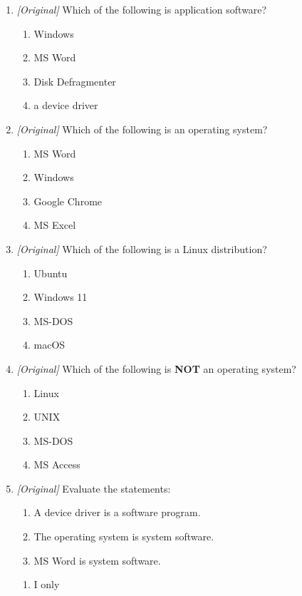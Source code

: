 \begin{enumerate}[label=\textbf{Q\arabic*.}, leftmargin=*]
\begin{enumerate}[label=\Alph*.]
  \end{enumerate}
\item \textit{[Original]} Which of the following is application software?
  \begin{enumerate}[label=\Alph*.]
    \item Windows
    \item MS Word
    \item Disk Defragmenter
    \item a device driver
  \end{enumerate}
\item \textit{[Original]} Which of the following is an operating system?
  \begin{enumerate}[label=\Alph*.]
    \item MS Word
    \item Windows
    \item Google Chrome
    \item MS Excel
  \end{enumerate}
\item \textit{[Original]} Which of the following is a Linux distribution?
  \begin{enumerate}[label=\Alph*.]
    \item Ubuntu
    \item Windows 11
    \item MS-DOS
    \item macOS
  \end{enumerate}
\item \textit{[Original]} Which of the following is \textbf{NOT} an operating
  system?
  \begin{enumerate}[label=\Alph*.]
    \item Linux
    \item UNIX
    \item MS-DOS
    \item MS Access
  \end{enumerate}
\item \textit{[Original]} Evaluate the statements:
  \begin{enumerate}[label=\Roman*.]
    \item A device driver is a software program.
    \item The operating system is system software.
    \item MS Word is system software.
  \end{enumerate}
  \begin{enumerate}[label=\Alph*.]
    \item I only

\end{enumerate}
\end{enumerate}
